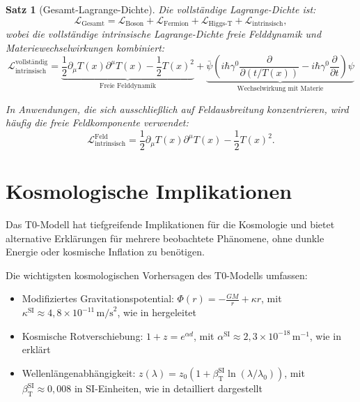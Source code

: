 \documentclass[12pt,a4paper]{article}
\newcommand{\Tfield}{T(x)}
\newcommand{\betaT}{\beta_{\text{T}}}
\newtheorem{theorem}{Satz}[section]
\theoremstyle{definition}
\theoremstyle{remark}
\begin{document}
\begin{theorem}[Gesamt-Lagrange-Dichte]
	Die vollständige Lagrange-Dichte ist:
	\begin{equation}
		\mathcal{L}_{\text{Gesamt}} = \mathcal{L}_{\text{Boson}} + \mathcal{L}_{\text{Fermion}} + \mathcal{L}_{\text{Higgs-T}} + \mathcal{L}_{\text{intrinsisch}},
	\end{equation}
	wobei die vollständige intrinsische Lagrange-Dichte freie Felddynamik und Materiewechselwirkungen kombiniert:
	\begin{equation}
		\mathcal{L}_{\text{intrinsisch}}^{\text{vollständig}} = \underbrace{\frac{1}{2} \partial_\mu \Tfield \partial^\mu \Tfield - \frac{1}{2}\Tfield^2}_{\text{Freie Felddynamik}} + \underbrace{\bar{\psi} \left( i\hbar \gamma^0 \frac{\partial}{\partial (t/\Tfield)} - i\hbar \gamma^0 \frac{\partial}{\partial t} \right) \psi}_{\text{Wechselwirkung mit Materie}}
	\end{equation}
	
	In Anwendungen, die sich ausschließlich auf Feldausbreitung konzentrieren, wird häufig die freie Feldkomponente verwendet:
	\begin{equation}
		\mathcal{L}_{\text{intrinsisch}}^{\text{Feld}} = \frac{1}{2} \partial_\mu \Tfield \partial^\mu \Tfield - \frac{1}{2} \Tfield^2.
	\end{equation}
\end{theorem}
	\section{Kosmologische Implikationen}
	Das T0-Modell hat tiefgreifende Implikationen für die Kosmologie und bietet alternative Erklärungen für mehrere beobachtete Phänomene, ohne dunkle Energie oder kosmische Inflation zu benötigen.
	
	Die wichtigsten kosmologischen Vorhersagen des T0-Modells umfassen:
	\begin{itemize}
		\item Modifiziertes Gravitationspotential: \( \Phi(r) = -\frac{GM}{r} + \kappa r \), mit \( \kappa^{\text{SI}} \approx 4,8 \times 10^{-11} \, \text{m/s}^2 \), wie in \cite{pascher_emergente_gravitation_2025} hergeleitet
		\item Kosmische Rotverschiebung: \( 1 + z = e^{\alpha d} \), mit \( \alpha^{\text{SI}} \approx 2,3 \times 10^{-18} \, \text{m}^{-1} \), wie in \cite{pascher_galaxies_2025} erklärt
		\item Wellenlängenabhängigkeit: \( z(\lambda) = z_0 (1 + \betaT^{\text{SI}} \ln(\lambda/\lambda_0)) \), mit \( \betaT^{\text{SI}} \approx 0,008 \) in SI-Einheiten, wie in \cite{pascher_messdifferenzen_2025} detailliert dargestellt
	\end{itemize}
	
\end{document}
